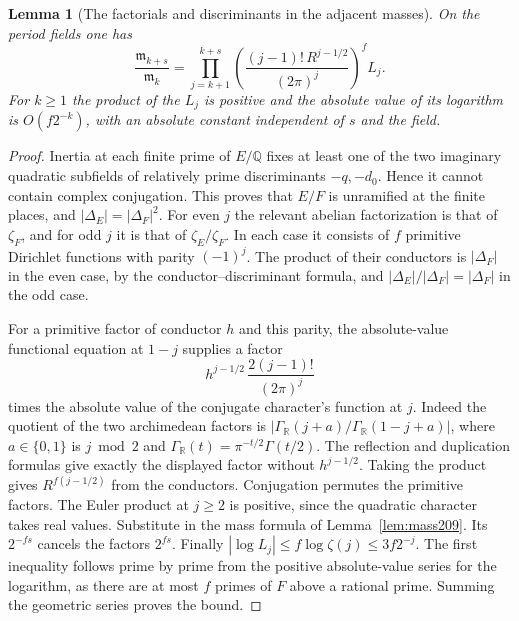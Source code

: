 \documentclass[a4paper,11pt]{article}
\newtheorem{lemma}[proposition]{Lemma}
\theoremstyle{definition}
\theoremstyle{remark}
\newcommand{\RR}{\mathbb R}\newcommand{\CC}{\mathbb C}\newcommand{\QQ}{\mathbb Q}
\numberwithin{equation}{section}
\begin{document}
\begin{lemma}[The factorials and discriminants in the adjacent masses]
\label{lem:mass232}
On the period fields one has
\[
 \frac{\mathfrak m_{k+s}}{\mathfrak m_k}
     =\prod_{j=k+1}^{k+s}
       \left(\frac{(j-1)!\,R^{j-1/2}}{(2\pi)^j}\right)^f L_j .
\]
For \(k\ge1\) the product of the \(L_j\) is positive and the
absolute value of its logarithm is \(O(f2^{-k})\), with an
absolute constant independent of \(s\) and the field.
\end{lemma}
\begin{proof}
Inertia at each finite prime of \(E/\QQ\) fixes at least one of
the two imaginary quadratic subfields of relatively prime
discriminants \(-q,-d_0\). Hence it cannot contain complex
conjugation. This proves that \(E/F\) is unramified at the finite
places, and \(|\Delta_E|=|\Delta_F|^2\).
For even \(j\) the relevant abelian factorization is that of
\(\zeta_F\), and for odd \(j\) it is that of \(\zeta_E/\zeta_F\).
In each case it consists of \(f\) primitive Dirichlet functions
with parity \((-1)^j\). The product of their conductors is
\(|\Delta_F|\) in the even case, by the conductor--discriminant
formula, and \(|\Delta_E|/|\Delta_F|=|\Delta_F|\) in the odd case.

For a primitive factor of conductor \(h\) and this parity, the
absolute-value functional equation at \(1-j\) supplies a factor
\[
   h^{j-1/2}\,\frac{2(j-1)!}{(2\pi)^j}
\]
times the absolute value of the conjugate character's function
at \(j\). Indeed the quotient of the two archimedean factors is
\( |\Gamma_{\RR}(j+a)/\Gamma_{\RR}(1-j+a)|\),
where \(a\in\{0,1\}\) is \(j\bmod2\) and
\(\Gamma_{\RR}(t)=\pi^{-t/2}\Gamma(t/2)\). The reflection
and duplication formulas give exactly the displayed factor
without \(h^{j-1/2}\). Taking the product gives
\(R^{f(j-1/2)}\) from the conductors.
Conjugation permutes the primitive factors. The Euler product
at \(j\ge2\) is positive, since the quadratic character takes
real values. Substitute in the mass formula of Lemma~\ref{lem:mass209}.
Its \(2^{-fs}\) cancels the factors \(2^{fs}\).
Finally \(|\log L_j|\le f\log\zeta(j)\le3f2^{-j}\).
The first inequality follows prime by prime from the positive
absolute-value series for the logarithm, as there are at most
\(f\) primes of \(F\) above a rational prime. Summing the
geometric series proves the bound.
\end{proof}
\end{document}
